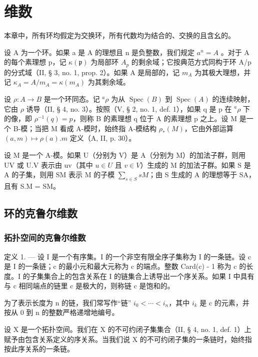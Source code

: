 \chapter{维数}

本章中，所有环均假定为交换环，所有代数均为结合的、交换的且含幺的。

设 A 为一个环。如果 a 是 A 的理想且 n 是负整数，我们规定 \(a^{n} = A\) 。对于 A 的每个素理想 p，记 \(\kappa(\mathfrak{p})\) 为局部环 \(A_{p}\) 的剩余域；它按典范方式同构于环 A/p 的分式域（II, § 3, no. 1, prop. 2）。如果 A 是局部的，记 \(m_{A}\) 为其极大理想，并记 \(\kappa_{A} = A/m_{A} = \kappa(m_{A})\) 为其剩余域。

设 \(\rho: A \to B\) 是一个环同态。记 \(^a\rho\) 为从 \(\operatorname{Spec}(B)\) 到 \(\operatorname{Spec}(A)\) 的连续映射，它由 \(\rho\) 诱导（II, § 4, no. 3）。按照（V, § 2, no. 1, def. 1），如果 q 是 p 在 \(^a\rho\) 下的像，即 \(\rho^{-1}(q) = p\)，则称 B 的素理想 q 位于 A 的素理想 p 之上。设 M 是一个 B-模；当把 M 看成 A-模时，始终指 A-模结构 \(\rho_*(M)\)，它由外部运算 \((a, m) \mapsto \rho(a).m\) 定义（A, II, p. 30）。

设 M 是一个 A-模。如果 U（分别为 V）是 A（分别为 M）的加法子群，则用 UV 或 U.V 表示由 uv（其中 \(u \in U\) 且 \(v \in V\)）生成的 M 的加法子群。如果 S 是 A 的子集，则用 SM 表示 M 的子模 \(\sum_{s \in S} sM\)；由 S 生成的 A 的理想等于 SA，且有 S.M = SM。

\section{环的克鲁尔维数}

\subsection{拓扑空间的克鲁尔维数}

定义 1. --- 设 I 是一个有序集。I 的一个非空有限全序子集称为 I 的一条链。设 c 是 I 的一条链；c 的最小元和最大元称为 c 的端点。整数 Card(c) - 1 称为 c 的长度。I 的子集集合上的包含关系在 I 的链集合上诱导出一个序关系。如果 I 中具有与 c 相同端点的链里 c 是极大的，则称链 c 是饱和的。

为了表示长度为 n 的链，我们常写作“链” \(i_{0} < \cdots < i_{n}\)，其中 \(i_{k}\) 是 c 的元素，并按从 0 到 n 的整数严格递增地编号。

设 X 是一个拓扑空间。我们在 X 的不可约闭子集集合（II, § 4, no. 1, def. 1）上赋予由包含关系定义的序关系。当我们说 X 的不可约闭子集的一条链时，始终指按此序关系的一条链。

